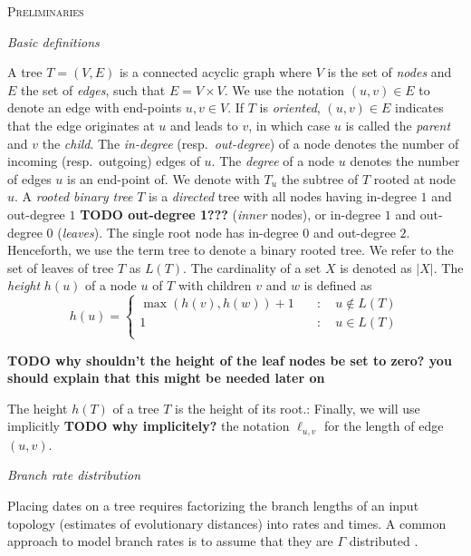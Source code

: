 \documentclass{llncs}
\renewcommand{\section}[1]{%
\bigskip
\begin{center}
\begin{Large}
\normalfont\scshape #1
\medskip
\end{Large}
\end{center}}
\renewcommand{\subsection}[1]{%
\bigskip
\begin{center}
\begin{large}
\normalfont\itshape #1
\end{large}
\end{center}}
\begin{document}
\section {Preliminaries}
%
%
\subsection{Basic definitions}
%
A tree $T=(V,E)$ is a connected acyclic graph where $V$ is the set of {\em
nodes} and $E$ the set of {\em edges}, such that $E = V\times V$. We use the
notation $(u,v) \in E$ to denote an edge with end-points $u,v \in V$. If $T$ is
{\em oriented}, $(u,v) \in E$ indicates that the edge originates at $u$ and leads
to $v$, in which case $u$ is called the {\em parent} and $v$ the {\em child}.
The {\em in-degree} (resp.~{\em out-degree}) of a node denotes the
number of incoming (resp.~outgoing) edges of $u$. The
{\em degree} of a node $u$ denotes the number of edges $u$ is an end-point of.
We denote with $T_u$ the subtree of $T$ rooted at node $u$.  A {\em
rooted binary tree} $T$ is a {\em directed} tree with all nodes having
in-degree $1$ and out-degree $1$ {\bf TODO out-degree 1???}  ({\em inner} nodes), or in-degree $1$ and out-degree
$0$ ({\em leaves}). The single root node has in-degree $0$ and out-degree $2$.  
Henceforth, we use the term tree to denote a
binary rooted tree.  We refer to the set of leaves of tree $T$ as $L(T)$.  The
cardinality of a set $X$ is denoted as $|X|$. The {\em height} $h(u)$ of a node
$u$ of $T$ with children $v$ and $w$ is defined as 
%
\[ h(u) = \left\{ \begin{array}{ll}
\max(h(v), h(w)) + 1 & \quad : \quad u \notin L(T)\\
1                    & \quad : \quad u    \in L(T)\\
\end{array}\right. \] 

{\bf TODO why shouldn't the height of the leaf nodes be set to zero? you should explain that this might be needed later on}

The height $h(T)$ of a tree $T$ is the height of its root.: Finally, we will
use implicitly {\bf TODO why implicitely?} the notation $\ell_{u,v}$ for the length of edge $(u,v)$.

\subsection{Branch rate distribution}
Placing dates on a tree requires factorizing the branch lengths of an input topology (estimates of evolutionary distances) 
into rates and times. 
A common approach to model branch rates is to assume that they are $\Gamma$ distributed \citep{Kishino2001}.
\end{document}
